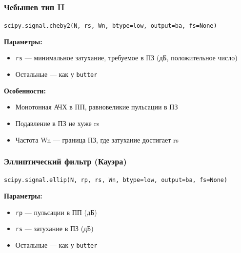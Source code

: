 \documentclass[12pt,a4paper,openany]{book}
\providecommand{\tightlist}{\setlength{\itemsep}{0pt}\setlength{\parskip}{0pt}}
\begin{document}
\subsubsection*{Чебышев тип II}

\texttt{scipy.\allowbreak{}signal.\allowbreak{}cheby2(\allowbreak{}N,\allowbreak{}\ rs,\allowbreak{}\ Wn,\allowbreak{}\ btype=\allowbreak{}\textquotesingle{}\allowbreak{}low\textquotesingle{}\allowbreak{},\allowbreak{}\ output=\allowbreak{}\textquotesingle{}\allowbreak{}ba\textquotesingle{}\allowbreak{},\allowbreak{}\ fs=\allowbreak{}None)}

\textbf{Параметры:}

\begin{itemize}
\tightlist
\item
  \texttt{rs} --- минимальное затухание, требуемое в ПЗ (дБ, положительное число)
\item
  Остальные --- как у \texttt{butter}
\end{itemize}

\textbf{Особенности:}

\begin{itemize}
\tightlist
\item
  Монотонная АЧХ в ПП, равновеликие пульсации в ПЗ
\item
  Подавление в ПЗ не хуже rs
\item
  Частота Wn --- граница ПЗ, где затухание достигает rs
\end{itemize}

\subsubsection*{Эллиптический фильтр (Кауэра)}

\texttt{scipy.\allowbreak{}signal.\allowbreak{}ellip(\allowbreak{}N,\allowbreak{}\ rp,\allowbreak{}\ rs,\allowbreak{}\ Wn,\allowbreak{}\ btype=\allowbreak{}\textquotesingle{}\allowbreak{}low\textquotesingle{}\allowbreak{},\allowbreak{}\ output=\allowbreak{}\textquotesingle{}\allowbreak{}ba\textquotesingle{}\allowbreak{},\allowbreak{}\ fs=\allowbreak{}None)}

\textbf{Параметры:}

\begin{itemize}
\tightlist
\item
  \texttt{rp} --- пульсации в ПП (дБ)
\item
  \texttt{rs} --- затухание в ПЗ (дБ)
\item
  Остальные --- как у \texttt{butter}
\end{itemize}
\end{document}
